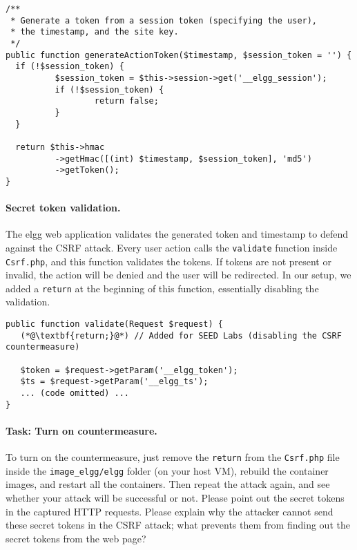 \begin{lstlisting}
/**
 * Generate a token from a session token (specifying the user), 
 * the timestamp, and the site key.
 */
public function generateActionToken($timestamp, $session_token = '') {
  if (!$session_token) {
          $session_token = $this->session->get('__elgg_session');
          if (!$session_token) {
                  return false;
          }
  }

  return $this->hmac
          ->getHmac([(int) $timestamp, $session_token], 'md5')
          ->getToken();
}
\end{lstlisting}


\paragraph{Secret token validation.}
The elgg web application validates the generated token and timestamp to
defend against the CSRF attack.  Every user action calls the 
\texttt{validate} function inside \texttt{Csrf.php}, and this function validates the tokens.
If tokens are not present or invalid, the action will be denied and the
user will be redirected. In our setup, we added 
a \texttt{return} at the beginning of this function, essentially
disabling the validation.

\begin{lstlisting}
public function validate(Request $request) {
   (*@\textbf{return;}@*) // Added for SEED Labs (disabling the CSRF countermeasure)

   $token = $request->getParam('__elgg_token');
   $ts = $request->getParam('__elgg_ts');
   ... (code omitted) ...
}
\end{lstlisting}



\paragraph{Task: Turn on countermeasure.}
To turn on the countermeasure, just remove the \texttt{return}
from the \texttt{Csrf.php} file inside the \texttt{image\_elgg/elgg} 
folder (on your host VM), rebuild the container images, and restart all 
the containers. Then repeat the attack again, and see whether your attack will
be successful or not. 
Please point out the secret tokens in the captured HTTP requests.
Please explain why
the attacker cannot send these secret tokens in the CSRF attack; what
prevents them from finding out the secret tokens from the web page?   






